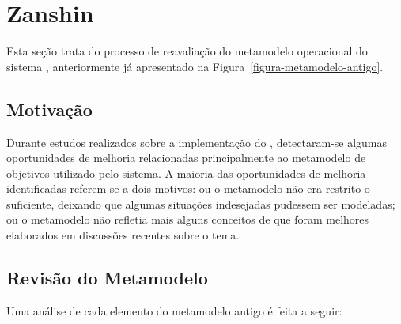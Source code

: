 
\chapter{Zanshin}
\label{sec-zanshin}

Esta seção trata do processo de reavaliação do metamodelo operacional do sistema \zanshin, anteriormente já apresentado na Figura~\ref{figura-metamodelo-antigo}.

\section{Motivação}
\label{sec-zanshin-motivacao}
Durante estudos realizados sobre a implementação do \framework \zanshin, detectaram-se algumas oportunidades de melhoria relacionadas principalmente ao metamodelo de objetivos utilizado pelo sistema. A maioria das oportunidades de melhoria identificadas referem-se a dois motivos: ou o metamodelo não era restrito o suficiente, deixando que algumas situações indesejadas pudessem ser modeladas; ou o metamodelo não refletia mais alguns conceitos de \gore que foram melhores elaborados em discussões recentes sobre o tema. 

\section{Revisão do Metamodelo}
\label{sec-zanshin-revisao}
Uma análise de cada elemento do metamodelo antigo é feita a seguir:

